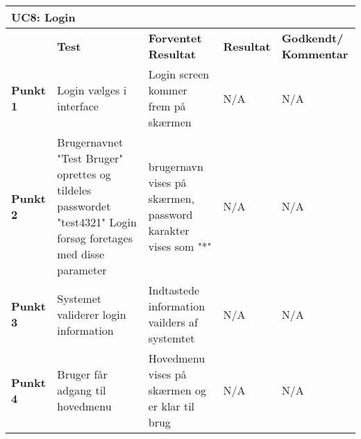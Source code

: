 \begin{table}[htbp] \centering
\begin{tabular}{|p{}|p{}|p{3cm}|p{3cm}|p{3cm}|} %
	\hline
\multicolumn{5}{|l|}{\textbf{UC8: Login}} \\\hline
&\textbf{Test} &\textbf{Forventet \newline Resultat} &\textbf{Resultat} &\textbf{Godkendt/ \newline Kommentar} \\\hline
\textbf{Punkt 1}		
&Login vælges i interface	
&Login screen kommer frem på skærmen 	
&N/A 	
&N/A \\\hline
\textbf{Punkt 2}		
&Brugernavnet "Test Bruger"  oprettes og tildeles passwordet "test4321" Login forsøg foretages med disse parameter	
&brugernavn vises på skærmen, password karakter vises som "*" 	
&N/A 	
&N/A \\\hline
\textbf{Punkt 3}		
&Systemet validerer login information		
&Indtastede information vailders af systemtet 	
&N/A 	
&N/A \\\hline
\textbf{Punkt 4}		
&Bruger får adgang til hovedmenu		
&Hovedmenu vises på skærmen og er klar til brug 	
&N/A 	
&N/A  \\\hline
	\end{tabular}
	\label{ATUC8} 
\end{table}